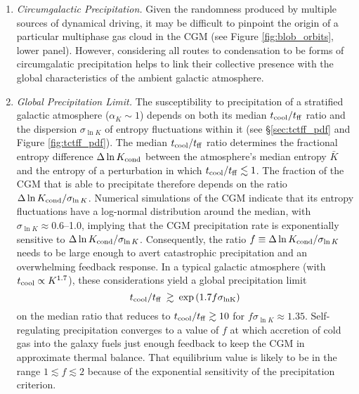 \documentclass[twocolumn]{aastex63}
\begin{document}
\begin{enumerate}
    \item \textit{Circumgalactic Precipitation.}  Given the randomness produced by multiple sources of dynamical driving, it may be difficult to pinpoint the origin of a particular multiphase gas cloud in the CGM (see Figure \ref{fig:blob_orbits}, lower panel).  However, considering all routes to condensation to be forms of circumgalatic precipitation helps to link their collective presence with the global characteristics of the ambient galactic atmosphere.
    
    \item \textit{Global Precipitation Limit.}  The susceptibility to precipitation of a stratified galactic atmosphere ($\alpha_K \sim 1$) depends on both its median $t_{\rm cool} / t_{\rm ff}$ ratio and the dispersion $\sigma_{\ln K}$ of entropy fluctuations within it (see \S \ref{sec:tctff_pdf} and Figure \ref{fig:tctff_pdf}).  The median $t_{\rm cool} / t_{\rm ff}$ ratio determines the fractional entropy difference $\Delta \ln K_{\rm cond}$ between the atmosphere's median entropy $\bar{K}$ and the entropy of a perturbation in which $t_{\rm cool} / t_{\rm ff} \lesssim 1$.  The fraction of the CGM that is able to precipitate therefore depends on the ratio $\Delta \ln K_{\rm cond} / \sigma_{\ln K}$.  Numerical simulations of the CGM indicate that its entropy fluctuations have a log-normal distribution around the median, with $\sigma_{\ln K} \approx 0.6$--1.0, implying that the CGM precipitation rate is exponentially sensitive to $\Delta \ln K_{\rm cond} / \sigma_{\ln K}$.  Consequently, the ratio $f \equiv \Delta \ln K_{\rm cond} / \sigma_{\ln K}$ needs to be large enough to avert catastrophic precipitation and an overwhelming feedback response.  In a typical galactic atmosphere (with $t_{\rm cool} \propto K^{1.7}$), these considerations yield a global precipitation limit
    \begin{equation}
        t_{\rm cool} / t_{\rm ff} 
          \: \gtrsim \: \exp \left( 1.7 f \sigma_{\rm ln K} \right)
        \label{eq:global_limit}
    \end{equation}  
    on the median ratio that reduces to $t_{\rm cool} / t_{\rm ff} \gtrsim 10$ for $f \sigma_{\ln K} \approx 1.35$.  Self-regulating precipitation converges to a value of $f$ at which accretion of cold gas into the galaxy fuels just enough  feedback to keep the CGM in approximate thermal balance.  That equilibrium value is likely to be in the range $1 \lesssim f \lesssim 2$ because of the exponential sensitivity of the precipitation criterion. 
    

\end{enumerate}
\end{document}
